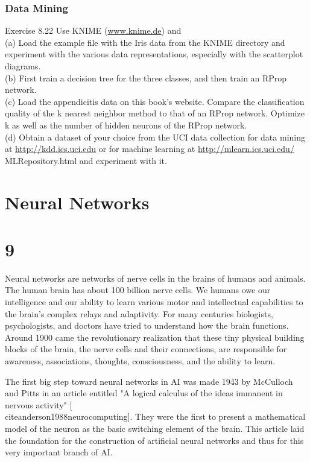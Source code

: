 \documentclass[10pt]{book}
\begin{document}
\subsubsection*{Data Mining}
Exercise 8.22 Use KNIME (\href{http://www.knime.de}{www.knime.de}) and\\
(a) Load the example file with the Iris data from the KNIME directory and experiment with the various data representations, especially with the scatterplot diagrams.\\
(b) First train a decision tree for the three classes, and then train an RProp network.\\
(c) Load the appendicitis data on this book's website. Compare the classification quality of the k nearest neighbor method to that of an RProp network. Optimize k as well as the number of hidden neurons of the RProp network.\\
(d) Obtain a dataset of your choice from the UCI data collection for data mining at \href{http://kdd.ics.uci.edu}{http://kdd.ics.uci.edu} or for machine learning at \href{http://mlearn.ics.uci.edu/}{http://mlearn.ics.uci.edu/} MLRepository.html and experiment with it.


\section*{Neural Networks}
\section*{9}
Neural networks are networks of nerve cells in the brains of humans and animals. The human brain has about 100 billion nerve cells. We humans owe our intelligence and our ability to learn various motor and intellectual capabilities to the brain's complex relays and adaptivity. For many centuries biologists, psychologists, and doctors have tried to understand how the brain functions. Around 1900 came the revolutionary realization that these tiny physical building blocks of the brain, the nerve cells and their connections, are responsible for awareness, associations, thoughts, consciousness, and the ability to learn.

The first big step toward neural networks in AI was made 1943 by McCulloch and Pitts in an article entitled "A logical calculus of the ideas immanent in nervous activity" [\\cite{anderson1988neurocomputing}]. They were the first to present a mathematical model of the neuron as the basic switching element of the brain. This article laid the foundation for the construction of artificial neural networks and thus for this very important branch of AI.
\end{document}
